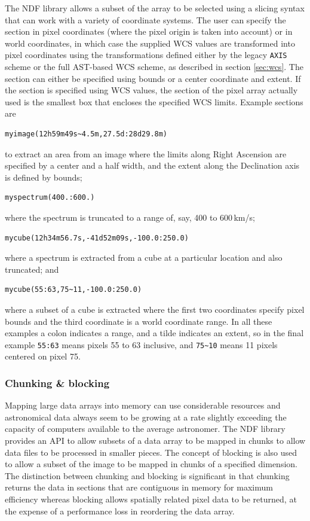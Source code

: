 \documentclass[final,authoryear,5p,times,twocolumn]{elsarticle}
\begin{document}
The NDF library allows a subset of the array to be selected using a
slicing syntax that can work with a variety of coordinate systems. The
user can specify the section in pixel coordinates (where the pixel
origin is taken into account) or in world coordinates, in which case the
supplied WCS values are transformed into pixel coordinates using the
transformations defined either by the legacy \texttt{AXIS} scheme or
the full AST-based WCS scheme, as described in section \ref{sec:wcs}.
The section can either be specified using bounds or a center coordinate
and extent. If the section is specified using WCS values, the section of
the pixel array actually used is the smallest box that encloses the
specified WCS limits. Example sections are
\begin{verbatim}
myimage(12h59m49s~4.5m,27.5d:28d29.8m)
\end{verbatim}
to extract an area from an image where the limits along Right
Ascension are specified by a center  and a half width, and the extent
along the Declination axis is defined by bounds;
\begin{verbatim}
myspectrum(400.:600.)
\end{verbatim}
where the spectrum is truncated to a range of, say, 400 to 600\,km/s;
\begin{verbatim}
mycube(12h34m56.7s,-41d52m09s,-100.0:250.0)
\end{verbatim}
where a spectrum is extracted from a cube at a particular location and
also truncated; and
\begin{verbatim}
mycube(55:63,75~11,-100.0:250.0)
\end{verbatim}
where a subset of a cube is extracted where the first two coordinates
specify pixel bounds and the third coordinate is a world coordinate
range. In all these examples a colon indicates a range, and a tilde
indicates an extent, so in the final example \texttt{55:63} means
pixels 55 to 63 inclusive, and \verb|75~10| means 11 pixels centered
on pixel 75.

\subsubsection{Chunking \& blocking}

Mapping large data arrays into memory can use considerable resources
and astronomical data always seem to be growing at a rate slightly
exceeding the capacity of computers available to the average astronomer. The NDF
library provides an API to allow subsets of a data array to be mapped
in chunks to allow data files to be processed in smaller pieces. The
concept of blocking is also used to allow a subset of the image to be
mapped in chunks of a specified dimension. The distinction between
chunking and blocking is significant in that chunking returns the data
in sections that are contiguous in memory for maximum efficiency
whereas blocking allows spatially related pixel data to be returned, at
the expense of a performance loss in reordering the data array.
\end{document}
